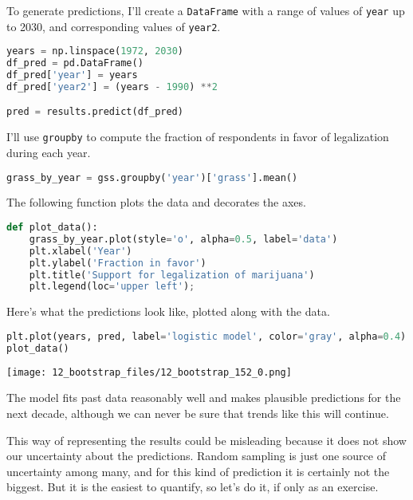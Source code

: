 To generate predictions, I'll create a
\passthrough{\lstinline!DataFrame!} with a range of values of
\passthrough{\lstinline!year!} up to 2030, and corresponding values of
\passthrough{\lstinline!year2!}.

\begin{lstlisting}[language=Python,style=source]
years = np.linspace(1972, 2030)
df_pred = pd.DataFrame()
df_pred['year'] = years
df_pred['year2'] = (years - 1990) **2

pred = results.predict(df_pred)
\end{lstlisting}

I'll use \passthrough{\lstinline!groupby!} to compute the fraction of
respondents in favor of legalization during each year.

\begin{lstlisting}[language=Python,style=source]
grass_by_year = gss.groupby('year')['grass'].mean()
\end{lstlisting}

The following function plots the data and decorates the axes.

\begin{lstlisting}[language=Python,style=source]
def plot_data():
    grass_by_year.plot(style='o', alpha=0.5, label='data')
    plt.xlabel('Year')
    plt.ylabel('Fraction in favor')
    plt.title('Support for legalization of marijuana')
    plt.legend(loc='upper left');
\end{lstlisting}

Here's what the predictions look like, plotted along with the data.

\begin{lstlisting}[language=Python,style=source]
plt.plot(years, pred, label='logistic model', color='gray', alpha=0.4)
plot_data()
\end{lstlisting}

\begin{center}
\texttt{[image: 12\_bootstrap\_files/12\_bootstrap\_152\_0.png]}
\end{center}

The model fits past data reasonably well and makes plausible predictions
for the next decade, although we can never be sure that trends like this
will continue.

This way of representing the results could be misleading because it does
not show our uncertainty about the predictions. Random sampling is just
one source of uncertainty among many, and for this kind of prediction it
is certainly not the biggest. But it is the easiest to quantify, so
let's do it, if only as an exercise.

